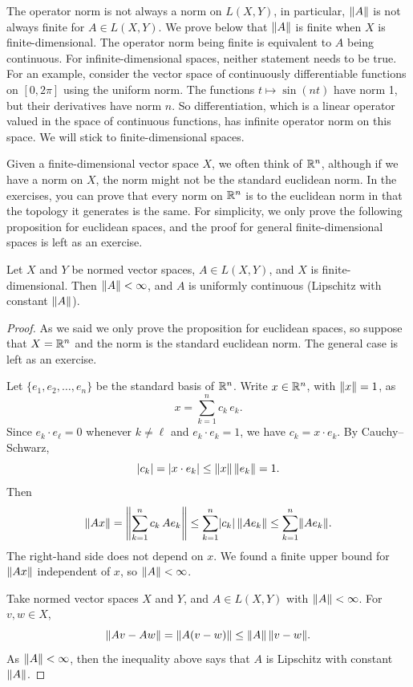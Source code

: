 The operator norm is not always a norm on $L(X,Y)$, in particular,
$\lVert {A} \rVert$ is not always finite for $A \in L(X,Y)$.
We prove below that $\lVert {A} \rVert$ is finite when $X$ is finite-dimensional.
The operator norm being finite is equivalent to $A$ being continuous.
For infinite-dimensional spaces, neither statement needs to be true.
For an example,
consider the vector space of continuously differentiable functions on
$[0,2\pi]$ using the uniform norm.  The functions
$t \mapsto \sin(n t)$ have norm 1, but their derivatives have norm $n$.  So
differentiation, which is a linear operator valued in the space of
continuous functions, has infinite operator norm on this space.
We will stick to finite-dimensional spaces.

Given a finite-dimensional vector space $X$, we often think of
${\mathbb{R}}^n$, although if we have a norm on $X$, the norm might not be
the standard euclidean norm.  In the exercises, you can prove that
every norm on ${\mathbb{R}}^n$ is  to the euclidean norm in that the
topology it generates is the same.  For simplicity, we only prove the
following proposition for euclidean spaces, and the proof for general
finite-dimensional spaces is left as an exercise.

\begin{prop} \label{prop:finitedimpropnormfin}
Let $X$ and $Y$ be normed vector spaces, $A \in L(X,Y)$, and
$X$ is finite-dimensional.
Then $\lVert {A} \rVert < \infty$, and
$A$ is uniformly continuous (Lipschitz with constant $\lVert {A} \rVert$).
\end{prop}

\begin{proof}
As we said we only prove the proposition for euclidean spaces, so suppose
that $X = {\mathbb{R}}^n$ and the norm is the standard euclidean norm.
The general case is left as an exercise.

Let $\{ e_1,e_2,\ldots,e_n \}$ be the standard basis of ${\mathbb{R}}^n$.
Write $x \in {\mathbb{R}}^n$, with $\lVert {x} \rVert = 1$, as
\begin{equation*}
x = \sum_{k=1}^n c_k \, e_k .
\end{equation*}
Since $e_k \cdot e_\ell = 0$ whenever $k\not=\ell$ and $e_k \cdot e_k = 1$,
we have $c_k = x \cdot e_k$.  By Cauchy--Schwarz,
\begin{equation*}
\lvert {c_k} \rvert = \lvert { x \cdot e_k } \rvert
\leq \lVert {x} \rVert \, \lVert {e_k} \rVert = 1 .
\end{equation*}
Then
\begin{equation*}
\lVert {Ax} \rVert =
\left\lVert {\sum_{k=1}^n c_k \, Ae_k} \right\rVert
\leq
\sum_{k=1}^n \lvert {c_k} \rvert \, \lVert {Ae_k} \rVert 
\leq
\sum_{k=1}^n \lVert {Ae_k} \rVert .
\end{equation*}
The right-hand side does not depend on $x$.  We found
a finite upper bound for $\lVert {Ax} \rVert$ independent of $x$, so $\lVert {A} \rVert < \infty$.

Take normed vector spaces $X$ and $Y$, and $A \in L(X,Y)$ with
$\lVert {A} \rVert < \infty$.
For $v,w \in X$,
\begin{equation*}
\lVert {Av - Aw} \rVert =
\lVert {A(v-w)} \rVert \leq \lVert {A} \rVert \, \lVert {v-w} \rVert .
\end{equation*}
As $\lVert {A} \rVert < \infty$, then the inequality above says that
$A$ is Lipschitz with constant $\lVert {A} \rVert$.
\end{proof}

